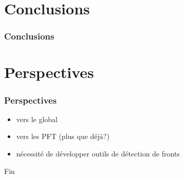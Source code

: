 \documentclass[11pt, french, aspectratio=32]{beamer}
\begin{document}

\section{Conclusions}

\begin{frame}
  \frametitle{Conclusions}

\end{frame}


\section{Perspectives}
\begin{frame}
  \frametitle{Perspectives}

  \begin{itemize}
    \item vers le global
    \item vers les PFT (plus que déjà?)
    \item nécessité de développer outils de détection de fronts
  \end{itemize}

\end{frame}


\begin{frame}
  Fin
\end{frame}
\end{document}
